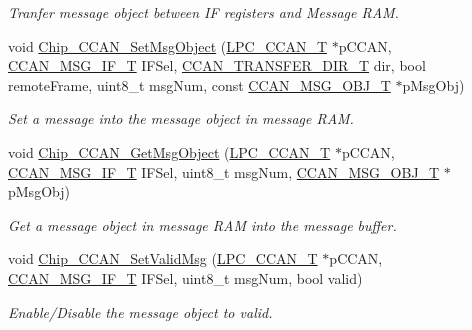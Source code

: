 \begin{DoxyCompactItemize}
\begin{DoxyCompactList}\small\item\em Tranfer message object between IF registers and Message R\+AM. \end{DoxyCompactList}\item 
void \hyperlink{group___c_c_a_n__18_x_x__43_x_x_ga15f704e1c960d69aaaa2ea17c0247048}{Chip\+\_\+\+C\+C\+A\+N\+\_\+\+Set\+Msg\+Object} (\hyperlink{struct_l_p_c___c_c_a_n___t}{L\+P\+C\+\_\+\+C\+C\+A\+N\+\_\+T} $\ast$p\+C\+C\+AN, \hyperlink{group___c_c_a_n__18_x_x__43_x_x_gac90da0138c430750d2d7d55d4448cae7}{C\+C\+A\+N\+\_\+\+M\+S\+G\+\_\+\+I\+F\+\_\+T} I\+F\+Sel, \hyperlink{group___c_c_a_n__18_x_x__43_x_x_gac400be6c4ae22b8b773b0bea6e9c5f02}{C\+C\+A\+N\+\_\+\+T\+R\+A\+N\+S\+F\+E\+R\+\_\+\+D\+I\+R\+\_\+T} dir, bool remote\+Frame, uint8\+\_\+t msg\+Num, const \hyperlink{struct_c_c_a_n___m_s_g___o_b_j___t}{C\+C\+A\+N\+\_\+\+M\+S\+G\+\_\+\+O\+B\+J\+\_\+T} $\ast$p\+Msg\+Obj)
\begin{DoxyCompactList}\small\item\em Set a message into the message object in message R\+AM. \end{DoxyCompactList}\item 
void \hyperlink{group___c_c_a_n__18_x_x__43_x_x_gadab63c8847a26eae41257f5a89334b92}{Chip\+\_\+\+C\+C\+A\+N\+\_\+\+Get\+Msg\+Object} (\hyperlink{struct_l_p_c___c_c_a_n___t}{L\+P\+C\+\_\+\+C\+C\+A\+N\+\_\+T} $\ast$p\+C\+C\+AN, \hyperlink{group___c_c_a_n__18_x_x__43_x_x_gac90da0138c430750d2d7d55d4448cae7}{C\+C\+A\+N\+\_\+\+M\+S\+G\+\_\+\+I\+F\+\_\+T} I\+F\+Sel, uint8\+\_\+t msg\+Num, \hyperlink{struct_c_c_a_n___m_s_g___o_b_j___t}{C\+C\+A\+N\+\_\+\+M\+S\+G\+\_\+\+O\+B\+J\+\_\+T} $\ast$p\+Msg\+Obj)
\begin{DoxyCompactList}\small\item\em Get a message object in message R\+AM into the message buffer. \end{DoxyCompactList}\item 
void \hyperlink{group___c_c_a_n__18_x_x__43_x_x_ga3418e9cdab81c5c8d7fb18d4afa0bd6e}{Chip\+\_\+\+C\+C\+A\+N\+\_\+\+Set\+Valid\+Msg} (\hyperlink{struct_l_p_c___c_c_a_n___t}{L\+P\+C\+\_\+\+C\+C\+A\+N\+\_\+T} $\ast$p\+C\+C\+AN, \hyperlink{group___c_c_a_n__18_x_x__43_x_x_gac90da0138c430750d2d7d55d4448cae7}{C\+C\+A\+N\+\_\+\+M\+S\+G\+\_\+\+I\+F\+\_\+T} I\+F\+Sel, uint8\+\_\+t msg\+Num, bool valid)
\begin{DoxyCompactList}\small\item\em Enable/\+Disable the message object to valid. \end{DoxyCompactList}\item 

\end{DoxyCompactItemize}
